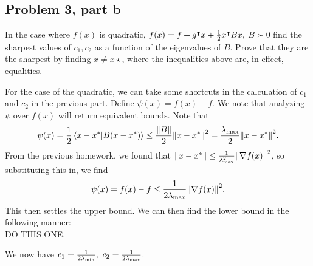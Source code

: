 \subsection{Problem 3, part b}
In the case where $f(x)$ is quadratic,
$f(x) = f + g^\intercal x + \frac{1}{2}x^\intercal Bx,$ $ B\succ 0$ find the sharpest values of $c_1, c_2$ as a function of the eigenvalues of $B$. Prove that they are the sharpest by finding $x \neq x\star$, where the inequalities above are, in effect, equalities.
\partbreak
\begin{solution}

    For the case of the quadratic, we can take some shortcuts in the calculation of $c_1$ and $c_2$ in the previous part. Define $\psi(x) = f(x) - f$. We note that analyzing $\psi$ over $f(x)$ will return equivalent bounds. Note that 
    \[\psi(x) = \frac{1}{2}\braket{x - x^{*}}{B(x - x^{*})} \leq \frac{\norm{B}}{2}\norm{x - x^{*}}^2 = \frac{\mathrm{\lambda}_{\max}}{2}\norm{x - x^{*}}^2.\]
    From the previous homework, we found that $\norm{x - x^{*}} \leq \frac{1}{\mathrm{\lambda}_{\max}^2}\norm{\nabla f(x)}^2$, so substituting this in, we find 
    \[\psi(x) = f(x) - f \leq \frac{1}{2\mathrm{\lambda}_{\max}}\norm{\nabla f(x)}^2.\]
    This then settles the upper bound. We can then find the lower bound in the following manner:\\

    \quad 
    DO THIS ONE.
    \quad

    We now have $c_1 = \frac{1}{2\lm_{\min}},\ c_2 = \frac{1}{2\lm_{\max}}$.
\end{solution}

\newpage
